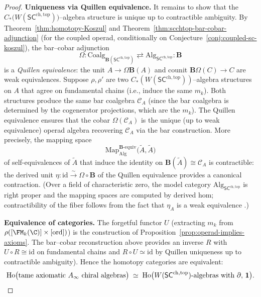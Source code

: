\begin{proof}
\medskip
\textbf{Uniqueness via Quillen equivalence.}
It remains to show that the
$C_\ast\!\bigl(W(\mathsf{SC}^{\mathrm{ch,top}})\bigr)$--algebra
structure is unique up to contractible ambiguity. By
Theorem~\ref{thm:homotopy-Koszul} and
Theorem~\ref{thm:scchtop-bar-cobar-adjunction} (for the coupled
operad, conditionally on
Conjecture~\ref{conj:coupled-sc-koszul}), the bar--cobar adjunction
\[
 \Omega \colon
 \mathrm{Coalg}_{\mathbf{B}(\mathsf{SC}^{\mathrm{ch,top}})}
 \rightleftarrows
 \mathrm{Alg}_{\mathsf{SC}^{\mathrm{ch,top}}}
 :\! \mathbf{B}
\]
is a \emph{Quillen equivalence}: the unit
$A \to \Omega\mathbf{B}(A)$ and counit
$\mathbf{B}\Omega(C) \to C$ are weak equivalences.
Suppose $\rho, \rho'$ are two
$C_\ast(W(\mathsf{SC}^{\mathrm{ch,top}}))$--algebra structures on
$A$ that agree on fundamental chains (i.e., induce the same $m_k$).
Both structures produce the same bar coalgebra $\mathcal{C}_A$
(since the bar coalgebra is determined by the cogenerator
projections, which are the $m_k$). The Quillen equivalence ensures
that the cobar $\Omega(\mathcal{C}_A)$ is the unique (up to weak
equivalence) operad algebra recovering $\mathcal{C}_A$ via the bar
construction. More precisely, the mapping space
\[
 \mathrm{Map}_{\mathrm{Alg}}^{\mathbf{B}\text{-equiv}}
 \!\bigl(\widetilde{A}, \widetilde{A}\bigr)
\]
of self-equivalences of $\widetilde{A}$ that induce the identity on
$\mathbf{B}(\widetilde{A}) \cong \mathcal{C}_A$ is contractible:
the derived unit $\eta \colon \mathrm{id} \xrightarrow{\sim}
\Omega \circ \mathbf{B}$ of the Quillen equivalence provides a
canonical contraction.
(Over a field of characteristic zero, the model category
$\mathrm{Alg}_{\mathsf{SC}^{\mathrm{ch,top}}}$ is right proper
and the mapping spaces are computed by derived hom; contractibility
of the fiber follows from the fact that $\eta_A$ is a weak
equivalence \cite{Val07, BM03}.)

\medskip
\textbf{Equivalence of categories.}
The forgetful functor $U$ (extracting $m_k$ from
$\rho([\FM_k(\C)] \times [\mathrm{ord}])$) is the construction of
Proposition~\ref{prop:operad-implies-axioms}. The bar--cobar
reconstruction above provides an inverse $R$ with
$U \circ R \cong \mathrm{id}$ on fundamental chains and
$R \circ U \simeq \mathrm{id}$ by Quillen uniqueness up to
contractible ambiguity). Hence the homotopy categories are
equivalent:
\[
 \mathrm{Ho}\bigl(\text{tame axiomatic }A_\infty\text{ chiral algebras}\bigr)
 \;\simeq\;
 \mathrm{Ho}\bigl(W(\mathsf{SC}^{\mathrm{ch,top}})\text{-algebras with
 }\partial,\,\mathbf{1}\bigr).
 \qedhere
\]
\end{proof}

